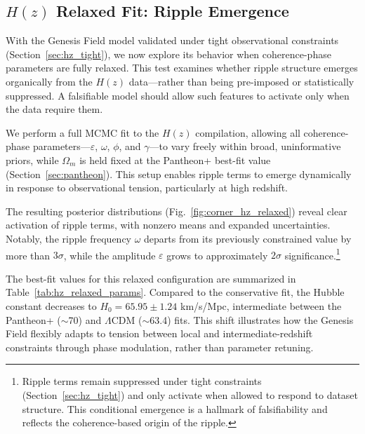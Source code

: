 \subsection{\texorpdfstring{$H(z)$}{Hz} Relaxed Fit: Ripple Emergence}
\label{sec:hz_relaxed}

With the Genesis Field model validated under tight observational constraints (Section~\ref{sec:hz_tight}), we now explore its behavior when coherence-phase parameters are fully relaxed. This test examines whether ripple structure emerges organically from the $H(z)$ data—rather than being pre-imposed or statistically suppressed. A falsifiable model should allow such features to activate only when the data require them.

We perform a full MCMC fit to the $H(z)$ compilation, allowing all coherence-phase parameters—$\varepsilon$, $\omega$, $\phi$, and $\gamma$—to vary freely within broad, uninformative priors, while $\Omega_m$ is held fixed at the Pantheon+ best-fit value (Section~\ref{sec:pantheon}). This setup enables ripple terms to emerge dynamically in response to observational tension, particularly at high redshift.

The resulting posterior distributions (Fig.~\ref{fig:corner_hz_relaxed}) reveal clear activation of ripple terms, with nonzero means and expanded uncertainties. Notably, the ripple frequency $\omega$ departs from its previously constrained value by more than $3\sigma$, while the amplitude $\varepsilon$ grows to approximately $2\sigma$ significance.\footnote{Ripple terms remain suppressed under tight constraints (Section~\ref{sec:hz_tight}) and only activate when allowed to respond to dataset structure. This conditional emergence is a hallmark of falsifiability and reflects the coherence-based origin of the ripple.}

The best-fit values for this relaxed configuration are summarized in Table~\ref{tab:hz_relaxed_params}. Compared to the conservative fit, the Hubble constant decreases to $H_0 = 65.95 \pm 1.24$ km/s/Mpc, intermediate between the Pantheon+ ($\sim$70) and $\Lambda$CDM ($\sim$63.4) fits. This shift illustrates how the Genesis Field flexibly adapts to tension between local and intermediate-redshift constraints through phase modulation, rather than parameter retuning.

